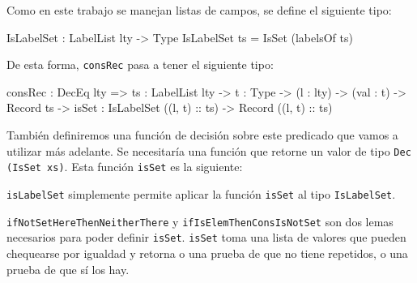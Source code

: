 Como en este trabajo se manejan listas de campos, se define el siguiente tipo:

\begin{code}
IsLabelSet : LabelList lty -> Type
IsLabelSet ts = IsSet (labelsOf ts)
\end{code}

De esta forma, \texttt{consRec} pasa a tener el siguiente tipo:

\begin{code}
consRec : DecEq lty => {ts : LabelList lty} ->
  {t : Type} -> (l : lty) -> (val : t) ->
  Record ts -> {isSet : IsLabelSet ((l, t) :: ts)} ->
  Record ((l, t) :: ts)
\end{code}

También definiremos una función de decisión sobre este predicado que vamos a utilizar más adelante. Se necesitaría una función que retorne un valor de tipo \texttt{Dec (IsSet xs)}. Esta función \texttt{isSet}  es la siguiente:


\texttt{isLabelSet} simplemente permite aplicar la función \texttt{isSet} al tipo \texttt{IsLabelSet}.

\texttt{ifNotSetHereThenNeitherThere} y \texttt{ifIsElemThenConsIsNotSet} son dos lemas necesarios para poder definir \texttt{isSet}. \texttt{isSet} toma una lista de valores que pueden chequearse por igualdad y retorna o una prueba de que no tiene repetidos, o una prueba de que sí los hay.

